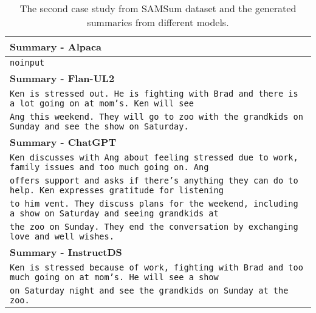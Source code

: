 \documentclass[11pt]{article}
\begin{document}
\begin{table*}[t]
\begin{adjustbox}{width=1.00\textwidth,center}
\begin{tabular}{ | l | }
        \textbf{Summary - Alpaca} \\ \hline
        \texttt{noinput}\\ \hline \hline
        
        \textbf{Summary - Flan-UL2} \\ \hline
        \texttt{Ken is stressed out. He is fighting with Brad and there is a lot going on at mom's. Ken will see } \\ 
        \texttt{Ang this weekend. They will go to zoo with the grandkids on Sunday and see the show on Saturday.}  \\ \hline \hline
        
        \textbf{Summary - ChatGPT} \\ \hline
        \texttt{Ken discusses with Ang about feeling stressed due to work, family issues and too much going on. Ang } \\
        \texttt{offers support and asks if there's anything they can do to help. Ken expresses gratitude for listening} \\
        \texttt{to him vent. They discuss plans for the weekend, including a show on Saturday and seeing grandkids at} \\
        \texttt{the zoo on Sunday. They end the conversation by exchanging love and well wishes. } \\ \hline \hline
        
        \textbf{Summary - InstructDS} \\ \hline
        \texttt{Ken is stressed because of work, fighting with Brad and too much going on at mom's. He will see a show} \\
        \texttt{on Saturday night and see the grandkids on Sunday at the zoo.} \\
        
        \bottomrule
        \end{tabular}
        \end{adjustbox}
        \caption{The second case study from SAMSum dataset and the generated summaries from different models.}
        \label{tab:SAMSum_examples2}
    \end{table*}
\end{document}
